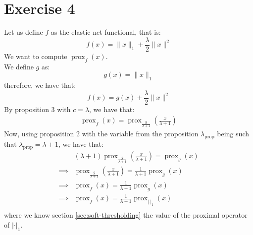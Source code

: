 \documentclass[12pt]{article}
\newcommand{\prox}{\operatorname{prox}}
\begin{document}
\section{Exercise 4}
Let us define $f$ as the elastic net functional, that is:
\begin{equation*}
  f(x) = \|x\|_1 + \frac{\lambda}{2}\|x\|^2
\end{equation*}
We want to compute $\prox_{f}(x)$. \\
We define $g$ as:
\begin{equation*}
  g(x) = \| x \|_1
\end{equation*}
therefore, we have that:
\begin{equation*}
  f(x) = g(x) + \frac{\lambda}{2}\|x\|^2
\end{equation*}
By proposition 3 with $c = \lambda$, we have that:
\begin{align*}
  \prox_{f}(x) = \prox_{\frac{g}{\lambda + 1}} \left( \frac{x}{\lambda + 1}\right)
\end{align*}
Now, using proposition 2 with the variable from the proposition $\lambda_{\text{prop}}$ being such that $\lambda_{\text{prop}} = \lambda + 1$, we have that:
\begin{align*}
           &
  (\lambda + 1) \prox_{\frac{g}{\lambda + 1}} \left( \frac{x}{\lambda + 1}\right) = \prox_{g} \left( x \right)         \\
  \implies &
  \prox_{\frac{g}{\lambda + 1}} \left( \frac{x}{\lambda + 1}\right) = \frac{1}{\lambda + 1} \prox_{g} \left( x \right) \\
  \implies &
  \prox_{f} \left( x \right) = \frac{1}{\lambda + 1} \prox_{g} \left( x \right)                                        \\
  \implies &
  \prox_{f} \left( x \right) = \frac{1}{\lambda + 1} \prox_{| \cdot |_1} \left( x \right)                              \\
\end{align*}
where we know section \ref{sec:soft-thresholding} the value of the proximal operator of $| \cdot |_1$.


\end{document}
